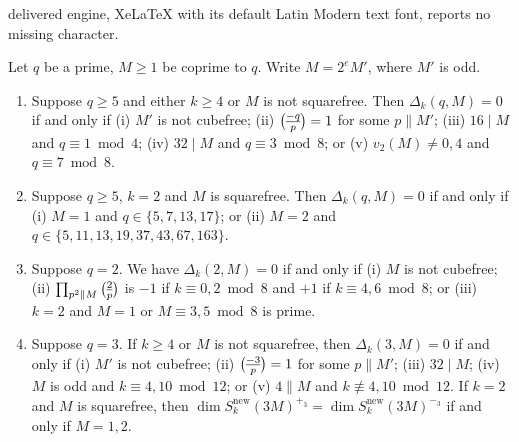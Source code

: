 \documentclass[10pt,a4paper]{amsart}
\newcommand{\leg}{\overwithdelims ()}
\newcommand{\new}{\mathrm{new}}
\renewcommand{\mod}{\bmod}
\begin{document}
delivered engine, XeLaTeX with its default Latin Modern text font, reports no missing character.
\begin{prop} \label{prop:req1}
Let $q$ be a prime, $M \ge 1$ be coprime to $q$.  Write $M=2^e M'$, where $M'$ is odd.

\begin{enumerate}
\item Suppose $q \ge 5$ and either $k \ge 4$ or $M$ is not squarefree.  Then
$\Delta_k(q,M) = 0$ if and only if 
(i) $M'$ is not cubefree; (ii) ${-q \leg p} = 1$ for some $p \parallel M'$; 
(iii) $16 \mid M$ and $q \equiv 1 \mod 4$; (iv) $32 \mid M$ and $q \equiv 3 \mod 8$;
or (v) $v_2(M) \ne 0, 4$ and $q \equiv 7 \mod 8$.

\item Suppose $q \ge 5$, $k=2$ and $M$ is squarefree.
Then $\Delta_k(q,M) = 0$ if and only if (i) $M = 1$ and
$q \in \{ 5, 7, 13, 17 \}$; or (ii) $M = 2$ and $q \in \{ 5, 11, 13, 19, 37, 43, 67, 163 \}$.

\item Suppose $q=2$.  We have $\Delta_k(2,M) = 0$ if and only if 
(i) $M$ is not cubefree; (ii) $\prod_{p^2 \parallel M} {2 \leg p}$ is $-1$
if $k \equiv 0, 2 \mod 8$ and $+1$ if $k \equiv 4, 6 \mod 8$; or
(iii) $k=2$ and $M = 1$ or $M \equiv 3, 5 \mod 8$ is prime.

\item Suppose $q=3$.  If $k \ge 4$ or $M$ is not squarefree, then  $\Delta_k(3,M) = 0$ if and only if (i) $M'$ is not cubefree; (ii) ${-3 \leg p} = 1$ for some $p \parallel M'$; (iii) $32 \mid M$; (iv) $M$ is odd and $k \equiv 4, 10 \mod 12$; or (v) $4 \parallel M$ and $k \not \equiv 4, 10 \mod 12$.
 If $k=2$ and $M$ is squarefree, then $\dim S_k^\new(3M)^{+_3} = \dim S_k^\new(3M)^{-_3}$ if and only if $M = 1, 2$. 
\end{enumerate}
\end{prop}
\end{document}
